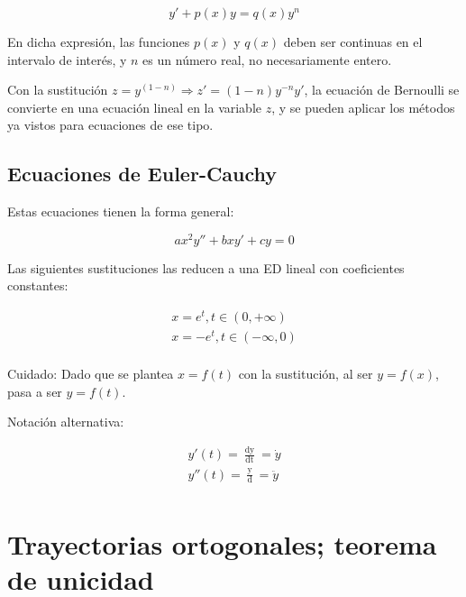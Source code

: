 \documentclass{article}
\begin{document}
\begin{equation}
y' + p(x) y = q(x) y^n
\end{equation}

En dicha expresión, las funciones $p(x)$ y $q(x)$ deben ser continuas en el intervalo de interés, y $n$ es un número real, no necesariamente entero.

Con la sustitución $z = y^{(1-n)} \Rightarrow z' = (1-n) y^{-n} y'$, la ecuación de Bernoulli se convierte en una ecuación lineal en la variable $z$, y se pueden aplicar los métodos ya vistos para ecuaciones de ese tipo.

\subsection{Ecuaciones de Euler-Cauchy}

Estas ecuaciones tienen la forma general:

\begin{equation}
a x^2 y'' + b x y' + c y = 0
\end{equation}

Las siguientes sustituciones las reducen a una ED lineal con coeficientes constantes:

\begin{subequations}
\begin{align}
x = e^t, t \in (0, +\infty) \\
x = -e^t, t \in (-\infty, 0) \\
\end{align}
\end{subequations}

Cuidado: Dado que se plantea $x = f(t)$ con la sustitución, al ser $y=f(x)$, pasa a ser $y = f(t)$.

Notación alternativa: 

\begin{subequations}
\begin{align}
y'(t) = \frac{\mathop{dy}}{\mathop{dt}} = \dot{y} \\
y''(t) = \frac{\mathop{d^2y}}{\mathop{dt^2}} = \ddot{y} \\
\end{align}
\end{subequations}

\newpage

\section{Trayectorias ortogonales; teorema de unicidad}
\end{document}
